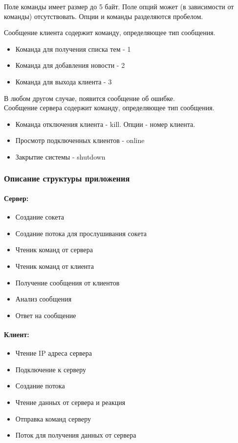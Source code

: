 Поле команды имеет размер до 5 байт. Поле опций может (в зависимости от команды) отсутствовать. Опции и команды разделяются пробелом.

Сообщение клиента  содержит команду, определяющее тип сообщения. 
\begin{itemize}
\item Команда для получения списка тем - 1
\item Команда для добавления новости - 2
\item Команда для выхода клиента - 3
\end{itemize}
В любом другом случае, появится сообщение об ошибке.\\

Сообщение сервера содержит команду, определяющее тип сообщения.
\begin{itemize}
\item Команда отключения клиента - kill. Опции - номер клиента.
\item Просмотр подключенных клиентов  - online
\item Закрытие системы - shutdown
\end{itemize}


\subsubsection{Описание структуры приложения}
\paragraph{Сервер:}
\begin{itemize}
\item Создание сокета
\item Создание потока для прослушивания сокета
\item Чтеник команд от сервера
\item Чтеник команд от клиента
\item Получение сообщения от клиентов
\item Анализ сообщения
\item Ответ на сообщение
\end{itemize}

\paragraph{Клиент:}
\begin{itemize}
\item Чтение IP адреса сервера
\item Подключение к серверу
\item Создание потока
\item Чтение данных от сервера и реакция
\item Отправка команд серверу
\item Поток для получения данных от сервера
\end{itemize}


